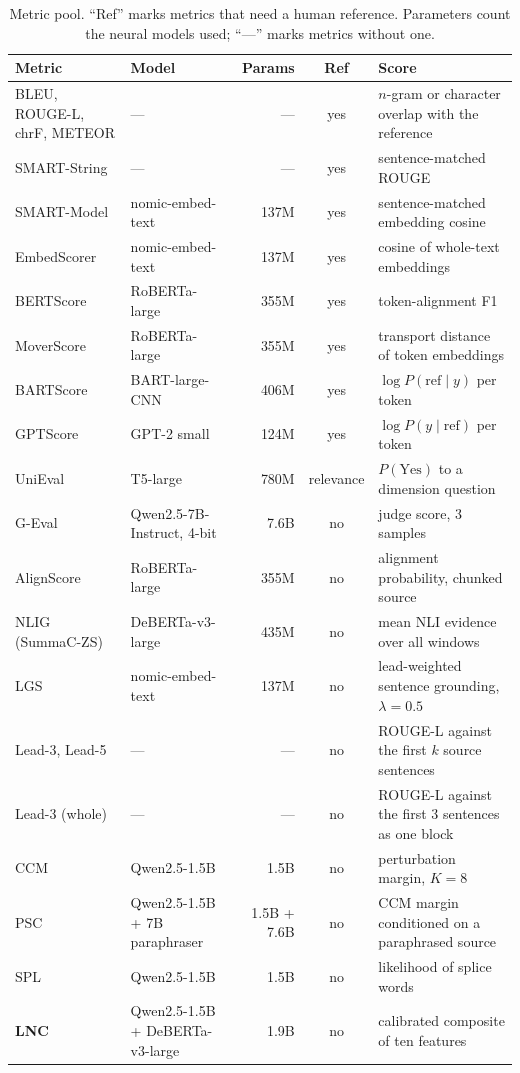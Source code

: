 \begin{table}[t]
\centering
\caption{Metric pool. ``Ref'' marks metrics that need a human reference. Parameters count the neural models used; ``---'' marks metrics without one.}
\label{tab:metrics}
\small
\begin{tabular}{@{}>{\raggedright\arraybackslash}p{3.0cm}>{\raggedright\arraybackslash}p{3.5cm}rc>{\raggedright\arraybackslash}p{4.4cm}@{}}
\toprule
Metric & Model & Params & Ref & Score \\
\midrule
BLEU, ROUGE-L, chrF, METEOR & --- & --- & yes & $n$-gram or character overlap with the reference \\
SMART-String & --- & --- & yes & sentence-matched ROUGE \\
SMART-Model & nomic-embed-text~\citep{nussbaum2024nomic} & 137M & yes & sentence-matched embedding cosine \\
EmbedScorer & nomic-embed-text & 137M & yes & cosine of whole-text embeddings \\
BERTScore & RoBERTa-large~\citep{liu2019roberta} & 355M & yes & token-alignment F1 \\
MoverScore & RoBERTa-large & 355M & yes & transport distance of token embeddings \\
BARTScore & BART-large-CNN~\citep{lewis2020bart} & 406M & yes & $\log P(\text{ref}\mid y)$ per token \\
GPTScore & GPT-2 small~\citep{radford2019gpt2} & 124M & yes & $\log P(y\mid\text{ref})$ per token \\
UniEval & T5-large~\citep{raffel2020t5} & 780M & relevance & $P(\text{Yes})$ to a dimension question \\
G-Eval & Qwen2.5-7B-Instruct, 4-bit & 7.6B & no & judge score, 3 samples \\
AlignScore & RoBERTa-large & 355M & no & alignment probability, chunked source \\
NLIG (SummaC-ZS) & DeBERTa-v3-large & 435M & no & mean NLI evidence over all windows \\
LGS & nomic-embed-text & 137M & no & lead-weighted sentence grounding, $\lambda=0.5$ \\
Lead-3, Lead-5 & --- & --- & no & ROUGE-L against the first $k$ source sentences \\
Lead-3 (whole) & --- & --- & no & ROUGE-L against the first 3 sentences as one block \\
CCM & Qwen2.5-1.5B & 1.5B & no & perturbation margin, $K=8$ \\
PSC & Qwen2.5-1.5B + 7B paraphraser & 1.5B + 7.6B & no & CCM margin conditioned on a paraphrased source \\
SPL & Qwen2.5-1.5B & 1.5B & no & likelihood of splice words \\
\textbf{LNC} & Qwen2.5-1.5B + DeBERTa-v3-large & 1.9B & no & calibrated composite of ten features \\
\bottomrule
\end{tabular}
\end{table}

